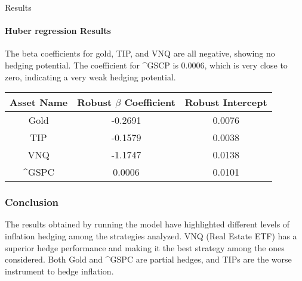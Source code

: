 \documentclass{beamer}
\begin{document}
\begin{frame}[fragile]{Results}
\framesubtitle{Huber regression Results}

 The beta coefficients for gold, TIP, and VNQ are all negative, showing no hedging potential. The coefficient for \textasciicircum GSCP is 0.0006,  which is very close to zero, indicating a very weak hedging potential. 

\begin{table}[h!]
  \centering
  \begin{tabular}{|c|c|c|}
    \hline
    \textbf{Asset Name} & \textbf{Robust $\beta$ Coefficient} & \textbf{Robust Intercept} \\
    \hline
    Gold & -0.2691 & 0.0076\\
    \hline
    TIP & -0.1579 & 0.0038\\
    \hline
    VNQ & -1.1747 & 0.0138\\
    \hline
    \textasciicircum GSPC & 0.0006 & 0.0101\\
    \hline
  \end{tabular}
  
  \label{tab:table2}
\end{table}
\end{frame}


\begin{frame}
  \frametitle{Conclusion}
The results obtained by running the model have highlighted different levels of inflation hedging among the strategies analyzed. VNQ (Real Estate ETF) has a superior hedge performance and making it the best strategy among the ones considered. 
Both Gold and \textasciicircum GSPC are partial hedges, and  TIPs are the worse instrument to hedge inflation.
\end{frame}
\end{document}
